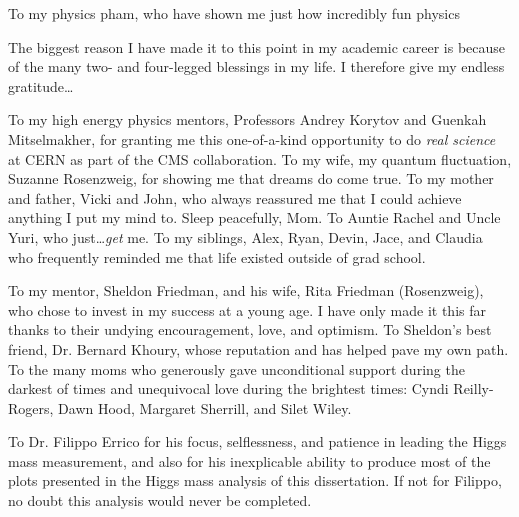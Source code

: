 To my physics pham, who have shown me just how incredibly fun physics 

The biggest reason I have made it to this point in my academic career is because of the many two- and four-legged blessings in my life.
I therefore give my endless gratitude\ldots

To my high energy physics mentors, Professors Andrey Korytov and Guenkah Mitselmakher, for granting me this one-of-a-kind opportunity to do \emph{real science} at CERN as part of the CMS collaboration.
To my wife, my quantum fluctuation, Suzanne Rosenzweig, for showing me that dreams do come true.
To my mother and father, Vicki and John, who always reassured me that I could achieve anything I put my mind to. Sleep peacefully, Mom.
To Auntie Rachel and Uncle Yuri, who just\ldots \emph{get} me. %
To my siblings, Alex, Ryan, Devin, Jace, and Claudia who frequently reminded me that life existed outside of grad school.

To my mentor, Sheldon Friedman, and his wife, Rita Friedman (Rosenzweig), who chose to invest in my success at a young age.
I have only made it this far thanks to their undying encouragement, love, and optimism.
To Sheldon's best friend, Dr. Bernard Khoury, whose reputation and has helped pave my own path.
To the many moms who generously gave unconditional support during the darkest of times and unequivocal love during the brightest times:
Cyndi Reilly-Rogers, Dawn Hood, Margaret Sherrill, and Silet Wiley.

To Dr. Filippo Errico for his focus, selflessness, and patience in leading the Higgs mass measurement, and also for his inexplicable ability to produce most of the plots presented in the Higgs mass analysis of this dissertation.
If not for Filippo, no doubt this analysis would never be completed.

